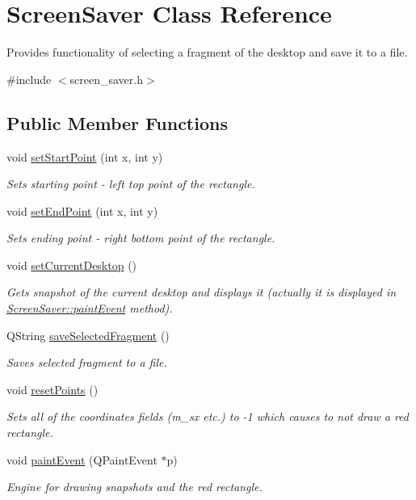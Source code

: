 \hypertarget{class_screen_saver}{\section{Screen\-Saver Class Reference}
\label{class_screen_saver}
}


Provides functionality of selecting a fragment of the desktop and save it to a file.  




{\ttfamily \#include $<$screen\-\_\-saver.\-h$>$}

\subsection*{Public Member Functions}
\begin{DoxyCompactItemize}
\item 
void \hyperlink{class_screen_saver_ab3040ba3666934c78eedd1f0beceffa2}{set\-Start\-Point} (int x, int y)
\begin{DoxyCompactList}\small\item\em Sets starting point -\/ left top point of the rectangle. \end{DoxyCompactList}\item 
void \hyperlink{class_screen_saver_acb8ee3dffd2bce3341d1f3fd46f7e15b}{set\-End\-Point} (int x, int y)
\begin{DoxyCompactList}\small\item\em Sets ending point -\/ right bottom point of the rectangle. \end{DoxyCompactList}\item 
void \hyperlink{class_screen_saver_acba796ba6b48e24aa65ee42687deede3}{set\-Current\-Desktop} ()
\begin{DoxyCompactList}\small\item\em Gets snapshot of the current desktop and displays it (actually it is displayed in \hyperlink{class_screen_saver_a06d7f1ec63a3c84752d1f0a11c15fe11}{Screen\-Saver\-::paint\-Event} method). \end{DoxyCompactList}\item 
Q\-String \hyperlink{class_screen_saver_a7d636a305825333ab50ed1198f9175b5}{save\-Selected\-Fragment} ()
\begin{DoxyCompactList}\small\item\em Saves selected fragment to a file. \end{DoxyCompactList}\item 
void \hyperlink{class_screen_saver_ab031b513dc618b4aeffb768d8ae9bd17}{reset\-Points} ()
\begin{DoxyCompactList}\small\item\em Sets all of the coordinates fields (m\-\_\-sx etc.) to -\/1 which causes to not draw a red rectangle. \end{DoxyCompactList}\item 
void \hyperlink{class_screen_saver_a06d7f1ec63a3c84752d1f0a11c15fe11}{paint\-Event} (Q\-Paint\-Event $\ast$p)
\begin{DoxyCompactList}\small\item\em Engine for drawing snapshots and the red rectangle. \end{DoxyCompactList}\end{DoxyCompactItemize}
